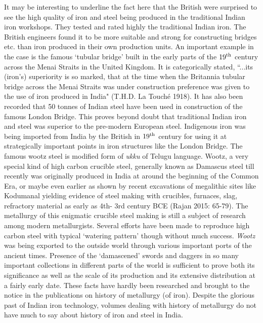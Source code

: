 It may be interesting to underline the fact here that the British were surprised to see the high quality of iron and steel being produced in the traditional Indian iron workshops. They tested and rated highly the traditional Indian iron. The British engineers found it to be more suitable and strong for constructing bridges etc. than iron produced in their own production units. An important example in the case is the famous `tubular bridge' built in the early parts of the $19^{\rm th}$ century across the Menai Straits in the United Kingdom. It is categorically stated, ``...its (iron's) superiority is so marked, that at the time when the Britannia tubular bridge across the Menai Straits was under construction preference was given to the use of iron produced in India" (T.H.D. La Touché 1918). It has also been recorded that 50 tonnes of Indian steel have been used in construction of the famous London Bridge. This proves beyond doubt that traditional Indian iron and steel was superior to the pre-modern European steel. Indigenous iron was being imported from India by the British in $19^{\rm th}$ century for using it at strategically important points in iron structures like the London Bridge. The famous wootz steel is modified form of \textit{ukku} of Telugu language. Wootz, a very special kind of high carbon crucible steel, generally known as Damascus steel till recently was originally produced in India at around the beginning of the Common Era, or maybe even earlier as shown by recent excavations of megalithic sites like Kodumanal yielding evidence of steel making with crucibles, furnaces, slag, refractory material as early as 4th- 3rd century BCE (Rajan 2015: 65-79). The metallurgy of this enigmatic crucible steel making is still a subject of research among modern metallurgists. Several efforts have been made to reproduce high carbon steel with typical `watering pattern' though without much success. \textit{Wootz} was being exported to the outside world through various important ports of the ancient times. Presence of the `damascened' swords and daggers in so many important collections in different parts of the world is sufficient to prove both its significance as well as the scale of its production and its extensive distribution at a fairly early date. These facts have hardly been researched and brought to the notice in the publications on history of metallurgy (of iron). Despite the glorious past of Indian iron technology, volumes dealing with history of metallurgy do not have much to say about history of iron and steel in India.


